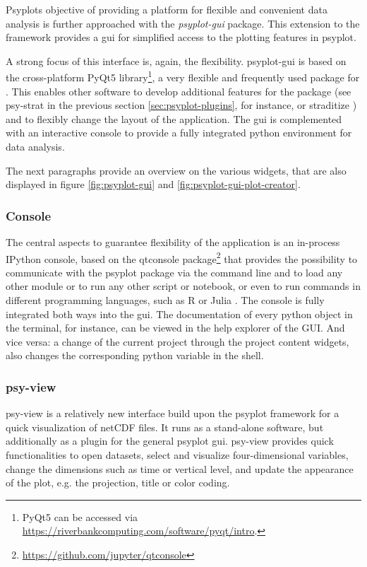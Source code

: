 \documentclass[
11pt, %
english, %
singlespacing, %
headsepline, %
]{article} %
\begin{document}
\begin{refsection}
Psyplots objective of providing a platform for flexible and convenient data analysis is further approached with the \textit{psyplot-gui} package. This extension to the framework provides a \gls{gui} for simplified access to the plotting features in psyplot.

A strong focus of this interface is, again, the flexibility. psyplot-gui is based on the cross-platform PyQt5 library\footnote{PyQt5 can be accessed via \url{https://riverbankcomputing.com/software/pyqt/intro}.}, a very flexible and frequently used package for . This enables other software to develop additional features for the package (see psy-strat in the previous section \ref{sec:psyplot-plugins}, for instance, or straditize \citep{SommerRechChevalierEtAl2019}) and to flexibly change the layout of the application. The \gls{gui} is complemented with an interactive console to provide a fully integrated python environment for data analysis.

The next paragraphs provide an overview on the various widgets, that are also displayed in figure \ref{fig:psyplot-gui} and \ref{fig:psyplot-gui-plot-creator}. 

\subsubsection{Console}
The central aspects to guarantee flexibility of the application is an in-process IPython console, based on the qtconsole package\footnote{\url{https://github.com/jupyter/qtconsole}} that provides the possibility to communicate with the psyplot package via the command line and to load any other module or to run any other script or notebook, or even to run commands in different programming languages, such as R \citep{RCT2019} or Julia \citep{BezansonEdelmanKarpinskiEtAl2017}. The console is fully integrated both ways into the \gls{gui}. The documentation of every python object in the terminal, for instance, can be viewed in the help explorer of the GUI. And vice versa: a change of the current project through the project content widgets, also changes the corresponding python variable in the shell. 

\subsubsection{psy-view}
psy-view \citep{Sommer2021} is a relatively new interface build upon the psyplot framework for a quick visualization of netCDF files. It runs as a stand-alone software, but additionally as a plugin for the general psyplot \gls{gui}. psy-view provides quick functionalities to open datasets, select and visualize four-dimensional variables, change the dimensions such as time or vertical level, and update the appearance of the plot, e.g. the projection, title or color coding. 


\end{refsection}
\end{document}
